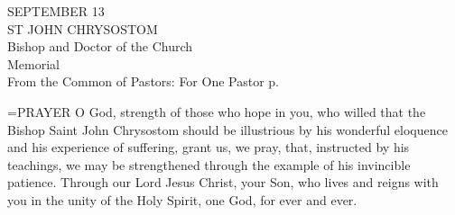 \begin{center}\normalsize SEPTEMBER 13\\
\footnotesize ST JOHN CHRYSOSTOM\\
\footnotesize Bishop and Doctor of the Church\\
\footnotesize Memorial\\
\footnotesize From the Common of Pastors: For One Pastor p.  \\
\end{center}

\hangindent=\parindent \small{PRAYER 
O God, strength of those who hope in you,
who willed that the Bishop Saint John Chrysostom
should be illustrious by his wonderful eloquence
and his experience of suffering,
grant us, we pray,
that, instructed by his teachings,
we may be strengthened through the example
of his invincible patience.
Through our Lord Jesus Christ, your Son,
who lives and reigns with you in the unity of the Holy Spirit,
one God, for ever and ever.\\}
 

